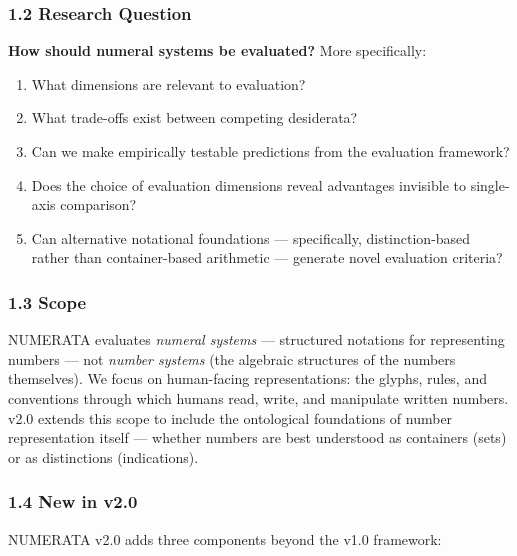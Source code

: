 \documentclass[
]{article}
\providecommand{\tightlist}{%
  \setlength{\itemsep}{0pt}\setlength{\parskip}{0pt}}
\begin{document}
\subsubsection{1.2 Research Question}\label{research-question}

\textbf{How should numeral systems be evaluated?} More specifically:

\begin{enumerate}
\def\labelenumi{\arabic{enumi}.}
\tightlist
\item
  What dimensions are relevant to evaluation?
\item
  What trade-offs exist between competing desiderata?
\item
  Can we make empirically testable predictions from the evaluation
  framework?
\item
  Does the choice of evaluation dimensions reveal advantages invisible
  to single-axis comparison?
\item
  Can alternative notational foundations --- specifically,
  distinction-based rather than container-based arithmetic --- generate
  novel evaluation criteria?
\end{enumerate}

\subsubsection{1.3 Scope}\label{scope}

NUMERATA evaluates \emph{numeral systems} --- structured notations for
representing numbers --- not \emph{number systems} (the algebraic
structures of the numbers themselves). We focus on human-facing
representations: the glyphs, rules, and conventions through which humans
read, write, and manipulate written numbers. v2.0 extends this scope to
include the ontological foundations of number representation itself ---
whether numbers are best understood as containers (sets) or as
distinctions (indications).

\subsubsection{1.4 New in v2.0}\label{new-in-v2.0}

NUMERATA v2.0 adds three components beyond the v1.0 framework:
\end{document}
